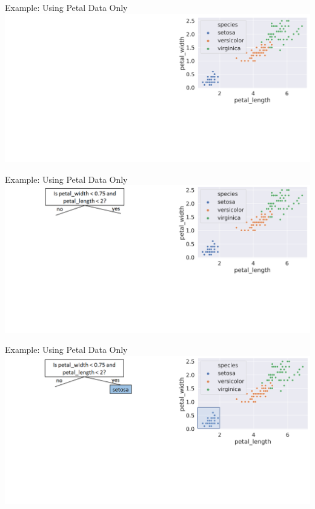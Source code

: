 \documentclass[aspectratio=169]{../latex_main/tntbeamer}  %
\begin{document}
	\begin{frame}{Example: Using Petal Data Only}
	        \includegraphics[scale=.34]{figure_tree/Bild5}
	\end{frame}
	
	
	\begin{frame}{Example: Using Petal Data Only}
	        \includegraphics[scale=.34]{figure_tree/Bild6}
	\end{frame}
	
	
	\begin{frame}{Example: Using Petal Data Only}
	        \includegraphics[scale=.34]{figure_tree/Bild7}
	\end{frame}
	
\end{document}
